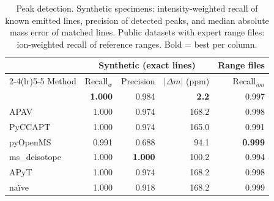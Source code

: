 \begin{table}[t]
\centering
\caption{Peak detection. Synthetic specimens: intensity-weighted
recall of known emitted lines, precision of detected peaks, and
median absolute mass error of matched lines. Public datasets with
expert range files: ion-weighted recall of reference ranges.
Bold = best per column.}
\label{tab:detection}
\small
\begin{tabular}{lrrrr}
\toprule
 & \multicolumn{3}{c}{Synthetic (exact lines)} & Range files \\
\cmidrule(lr){2-4}\cmidrule(lr){5-5}
Method & Recall$_w$ & Precision & $|\Delta m|$ (ppm) & Recall$_{ion}$ \\
\midrule
\rf{} & \textbf{1.000} & 0.984 & \textbf{2.2} & 0.997 \\
APAV & 1.000 & 0.974 & 168.2 & 0.998 \\
PyCCAPT & 1.000 & 0.974 & 165.0 & 0.991 \\
pyOpenMS & 0.991 & 0.688 & 94.1 & \textbf{0.999} \\
ms\_deisotope & 1.000 & \textbf{1.000} & 100.2 & 0.994 \\
APyT & 1.000 & 0.974 & 168.2 & 0.998 \\
na\"ive & 1.000 & 0.918 & 168.2 & 0.999 \\
\bottomrule
\end{tabular}
\end{table}
